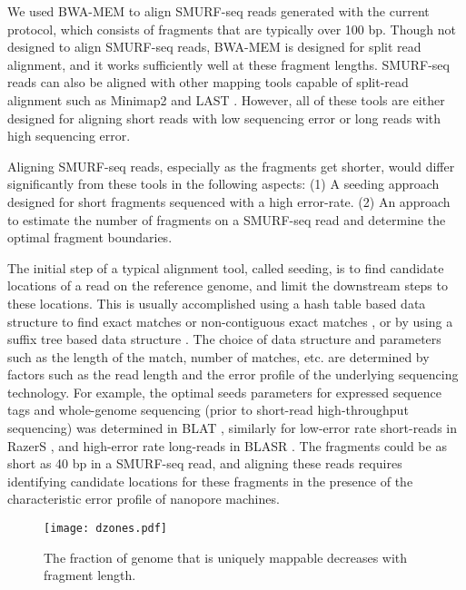 We used BWA-MEM \citep{li2013aligning} to align SMURF-seq reads
generated with the current protocol, which consists of fragments that
are typically over 100 bp. Though not designed to align SMURF-seq reads,
BWA-MEM is designed for split read alignment, and it works sufficiently
well at these fragment lengths.  SMURF-seq reads can also be aligned
with other mapping tools capable of split-read alignment such as
Minimap2 \citep{li2018minimap2} and LAST \citep{kielbasa2011adaptive}.
However, all of these tools are either designed for aligning short reads
with low sequencing error or long reads with high sequencing error.

Aligning SMURF-seq reads, especially as the fragments get shorter, would
differ significantly from these tools in the following aspects: (1) A
seeding approach designed for short fragments sequenced with a high
error-rate.  (2) An approach to estimate the number of fragments on a
SMURF-seq read and determine the optimal fragment boundaries.

The initial step of a typical alignment tool, called seeding, is to find
candidate locations of a read on the reference genome, and limit the
downstream steps to these locations.
%
This is usually accomplished using a hash table based data structure to
find exact matches
\citep{altschul1990basic,altschul1997gapped,kent2002blat} or
non-contiguous exact matches \citep{ma2002patternhunter,chen2009perm},
or by using a suffix tree based data structure
\citep{kurtz2004versatile,langmead2009ultrafast,li2009fast,
li2010fast,li2013aligning}.
%
The choice of data structure and parameters such as the length of the
match, number of matches, etc. are determined by factors such as the
read length and the error profile of the underlying sequencing
technology.
%
For example, the optimal seeds parameters for expressed sequence tags
and whole-genome sequencing (prior to short-read high-throughput
sequencing) was determined in BLAT \citep{kent2002blat}, similarly for
low-error rate short-reads in RazerS \citep{weese2009razers}, and
high-error rate long-reads in BLASR \citep{chaisson2012mapping}.
%
The fragments could be as short as 40 bp in a SMURF-seq read, and
aligning these reads requires identifying candidate locations for these
fragments in the presence of the characteristic error profile of
nanopore machines.

\begin{figure}[t!]
\centering
\texttt{[image: dzones.pdf]}
\caption[Uniquely mappable fraction of the genome decreases fragment
  length]{
  The fraction of genome that is uniquely mappable decreases with
  fragment length.}
\label{dzones}
\end{figure}

